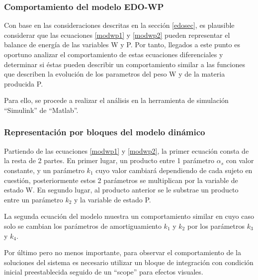 \subsubsection{Comportamiento del modelo EDO-WP}

Con base en las consideraciones descritas en la sección \ref{edosec}, es plausible considerar que las ecuaciones \ref{modwp1} y \ref{modwp2} pueden representar el balance de energía de las variables W y P. Por tanto, llegados a este punto es oportuno analizar el comportamiento de estas ecuaciones diferenciales y determinar si éstas pueden describir un comportamiento similar a las funciones que describen la evolución de los parametros del peso W y de la materia producida P. 

Para ello, se procede a realizar el análisis en la herramienta de simulación ``Simulink'' de ``Matlab''.
\subsubsection{Representación por bloques del modelo dinámico}

Partiendo de las ecuaciones \ref{modwp1} y \ref{modwp2}, la primer ecuación consta de la resta de 2 partes. En primer lugar, un producto entre 1 parámetro $\alpha_{s}$ con valor constante, y un parámetro $k_{1}$ cuyo valor cambiará dependiendo de cada sujeto en cuestión, posteriormente estos 2 parámetros se multiplican por la variable de estado W. En segundo lugar, al producto anterior se le substrae un producto entre un parámetro $k_{2}$ y la variable de estado P.

La segunda ecuación del modelo muestra un comportamiento similar en cuyo caso solo se cambian los parámetros de amortiguamiento $k_{1}$ y $k_{2}$ por los parámetros $k_{3}$ y $k_{4}$.

Por último pero no menos importante, para observar el comportamiento de la soluciones del sistema es necesario utilizar un bloque de integración con condición inicial preestablecida  seguido de un ``scope'' para efectos visuales.


